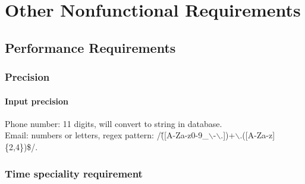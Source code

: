 \documentclass[16pt]{scrreprt}
\begin{document}
%
%
%


\chapter{Other Nonfunctional Requirements}
\label{Other Nonfunctional Requirements}
\section{Performance Requirements}
\subsection{Precision}
\subsubsection{Input precision}
Phone number: 11 digits, will convert to string in database. \\
Email: numbers or letters, regex pattern: /\^([A-Za-z0-9\_$\backslash$-$\backslash$.])+$\backslash$.([A-Za-z]\{2,4\})\$/. \\

\subsection{Time speciality requirement}
\end{document}

